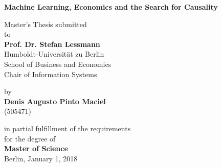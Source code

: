 \begin{center}

    {\Large{\bf Machine Learning, Economics and the Search for Causality}} \vspace{0.5cm}


    {\normalsize Master's Thesis submitted\\\vspace{0.5cm}
    to}\\\vspace{0.5cm}
    {\normalsize{\bf Prof. Dr. Stefan Lessmann}} \\\vspace{0.5cm}
    {\normalsize Humboldt-Universit\"at zu Berlin \\
    School of Business and Economics \\
    Chair of Information Systems} \vspace{1cm}


    {\normalsize by \\\vspace{0.5cm}
    {\bf Denis Augusto Pinto Maciel} \\
    (505471)} \vspace{1cm}


    {\normalsize in partial fulfillment of the requirements \\
    for the degree of \\
    {\bf Master of Science} \\
    Berlin, January 1, 2018}

\end{center}
